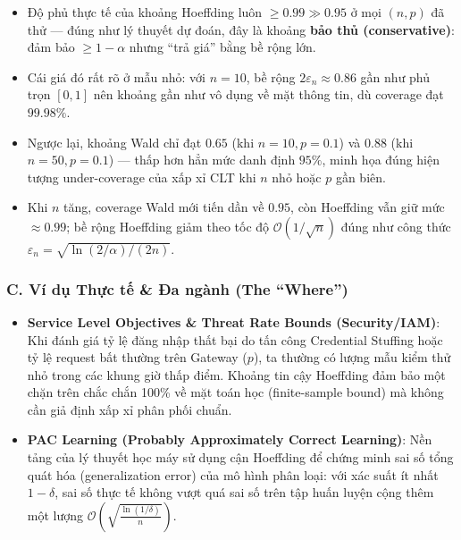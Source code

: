 \documentclass[12pt,a4paper]{article}
\begin{document}
\begin{itemize}

\item
  Độ phủ thực tế của khoảng Hoeffding luôn \(\ge 0.99 \gg 0.95\) ở mọi \((n, p)\) đã thử --- đúng như lý thuyết dự đoán, đây là khoảng \textbf{bảo thủ (conservative)}: đảm bảo \(\ge 1-\alpha\) nhưng ``trả giá'' bằng bề rộng lớn.
\item
  Cái giá đó rất rõ ở mẫu nhỏ: với \(n = 10\), bề rộng \(2\varepsilon_n \approx 0.86\) gần như phủ trọn \([0,1]\) nên khoảng gần như vô dụng về mặt thông tin, dù coverage đạt \(99.98\%\).
\item
  Ngược lại, khoảng Wald chỉ đạt \(0.65\) (khi \(n=10, p=0.1\)) và \(0.88\) (khi \(n=50, p=0.1\)) --- thấp hơn hẳn mức danh định \(95\%\), minh họa đúng hiện tượng under-coverage của xấp xỉ CLT khi \(n\) nhỏ hoặc \(p\) gần biên.
\item
  Khi \(n\) tăng, coverage Wald mới tiến dần về \(0.95\), còn Hoeffding vẫn giữ mức \(\approx 0.99\); bề rộng Hoeffding giảm theo tốc độ \(\mathcal{O}(1/\sqrt{n})\) đúng như công thức \(\varepsilon_n = \sqrt{\ln(2/\alpha)/(2n)}\).
\end{itemize}

\subsubsection{C. Ví dụ Thực tế \& Đa ngành (The ``Where'')}\label{c.-vuxed-dux1ee5-thux1ef1c-tux1ebf-ux111a-nguxe0nh-the-where-1}

\begin{itemize}

\item
  \textbf{Service Level Objectives \& Threat Rate Bounds (Security/IAM)}: Khi đánh giá tỷ lệ đăng nhập thất bại do tấn công Credential Stuffing hoặc tỷ lệ request bất thường trên Gateway (\(p\)), ta thường có lượng mẫu kiểm thử nhỏ trong các khung giờ thấp điểm. Khoảng tin cậy Hoeffding đảm bảo một chặn trên chắc chắn 100\% về mặt toán học (finite-sample bound) mà không cần giả định xấp xỉ phân phối chuẩn.
\item
  \textbf{PAC Learning (Probably Approximately Correct Learning)}: Nền tảng của lý thuyết học máy sử dụng cận Hoeffding để chứng minh sai số tổng quát hóa (generalization error) của mô hình phân loại: với xác suất ít nhất \(1 - \delta\), sai số thực tế không vượt quá sai số trên tập huấn luyện cộng thêm một lượng \(\mathcal{O}\left(\sqrt{\frac{\ln(1/\delta)}{n}}\right)\).
\end{itemize}
\end{document}
